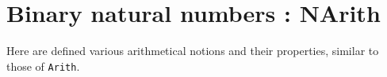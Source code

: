 \section{Binary natural numbers : NArith}\label{NArith}

Here are defined various arithmetical notions and their properties,
similar to those of {\tt Arith}.

